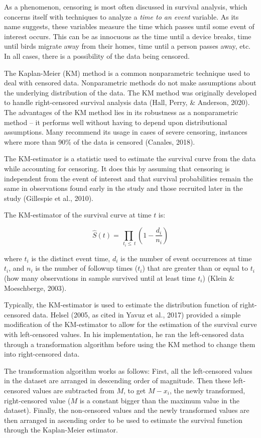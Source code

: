 \documentclass[12pt, twoside]{amherstthesis}
\begin{document}
As a phenomenon, censoring is most often discussed in survival analysis, which concerns itself with techniques to analyze a \emph{time to an event} variable. As its name suggests, these variables measure the time which passes until some event of interest occurs. This can be as innocuous as the time until a device breaks, time until birds migrate away from their homes, time until a person passes away, etc. In all cases, there is a possibility of the data being censored.

The Kaplan-Meier (KM) method is a common nonparametric technique used to deal with censored data. Nonparametric methods do not make assumptions about the underlying distribution of the data. The KM method was originally developed to handle right-censored survival analysis data (Hall, Perry, \& Anderson, 2020). The advantages of the KM method lies in its robustness as a nonparametric method -- it performs well without having to depend upon distributional assumptions. Many recommend its usage in cases of severe censoring, instances where more than 90\% of the data is censored (Canales, 2018).

The KM-estimator is a statistic used to estimate the survival curve from the data while accounting for censoring. It does this by assuming that censoring is independent from the event of interest and that survival probabilities remain the same in observations found early in the study and those recruited later in the study (Gillespie et al., 2010).

The KM-estimator of the survival curve at time \(t\) is:

\[\hat{S}(t) = \prod_{\ t_i \le \ t }\left(1-\frac{d_i}{n_i}\right)\]

where \(t_i\) is the distinct event time, \(d_i\) is the number of event occurrences at time \(t_i\), and \(n_i\) is the number of followup times (\(t_i\)) that are greater than or equal to \(t_i\) (how many observations in sample survived until at least time \(t_i\)) (Klein \& Moeschberge, 2003).

Typically, the KM-estimator is used to estimate the distribution function of right-censored data. Helsel (2005, as cited in Yavuz et al., 2017) provided a simple modification of the KM-estimator to allow for the estimation of the survival curve with left-censored values. In his implementation, he ran the left-censored data through a transformation algorithm before using the KM method to change them into right-censored data.

The transformation algorithm works as follows: First, all the left-censored values in the dataset are arranged in descending order of magnitude. Then these left-censored values are subtracted from \(M\), to get \(M-x_i\), the newly transformed, right-censored value (\(M\) is a constant bigger than the maximum value in the dataset). Finally, the non-censored values and the newly transformed values are then arranged in ascending order to be used to estimate the survival function through the Kaplan-Meier estimator.
\end{document}
